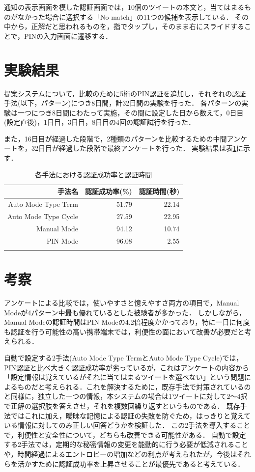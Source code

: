 \documentclass[twocolumn, a4paper, 9pt]{UECIEresume}
\newcommand{\bhline}{\noalign{\hrule height 1pt}}
\begin{document}
通知の表示画面を模した認証画面では，10個のツイートの本文と，当てはまるものがなかった場合に選択する「No match」の11つの候補を表示している．
その中から，正解だと思われるものを，指でタップし，そのまま右にスライドすることで，PINの入力画面に遷移する．

\section{実験結果}\label{result}
提案システムについて，比較のために5桁のPIN認証を追加し，それぞれの認証手法(以下，パターン)につき8日間，計32日間の実験を行った．
各パターンの実験は一つにつき8日間にわたって実施，その間に設定した日から数えて，0日目(設定直後)，1日目，3日目，8日目の4回の認証試行を行った．

また，16日目が経過した段階で，2種類のパターンを比較するための中間アンケートを，32日目が経過した段階で最終アンケートを行った．
実験結果は表\ref{eachResult}に示す．

\begin{table}[ht]
  \caption{各手法における認証成功率と認証時間}
  \label{eachResult}
  \begin{center}
    \small
    \begin{tabular}{rrr}
      \bhline
      手法名 & 認証成功率(\%) & 認証時間(秒) \\ \hline
      Auto Mode Type Term & 51.79 & 22.14 \\
      Auto Mode Type Cycle & 27.59 & 22.95 \\
      Manual Mode & 94.12 & 10.74 \\
      PIN Mode & 96.08 & 2.55 \\
      \bhline
    \end{tabular}
  \end{center}
\end{table}

\section{考察}\label{discussion}
アンケートによる比較では，使いやすさと憶えやすさ両方の項目で，Manual Modeが4パターン中最も優れているとした被験者が多かった．
しかしながら，Manual Modeの認証時間はPIN Modeの4.2倍程度かかっており，特に一日に何度も認証を行う可能性の高い携帯端末では，利便性の面において改善が必要だと考えられる．

自動で設定する2手法(Auto Mode Type TermとAuto Mode Type Cycle)では，PIN認証と比べ大きく認証成功率が劣っているが，これはアンケートの内容から「設定情報は覚えているがそれに当てはまるツイートを選べない」という問題によるものだと考えられる．これを解決するために，既存手法\cite{西垣正勝:2006-03-15}で対策されているのと同様に，独立した一つの情報，本システムの場合は1ツイートに対して2〜4択で正解の選択肢を答えさせ，それを複数回繰り返すというものである．
既存手法ではこれに加え，曖昧な記憶による認証の失敗を防ぐため，はっきりと覚えている情報に対してのみ正しい回答どうかを検証した．
この2手法を導入することで，利便性と安全性について，どちらも改善できる可能性がある．
自動で設定する2手法では，定期的な秘密情報の変更を能動的に行う必要が低減されることや，時間経過によるエントロピーの増加などの利点が考えられたが，今後はそれらを活かすために認証成功率を上昇させることが最優先であると考えている．
\end{document}
